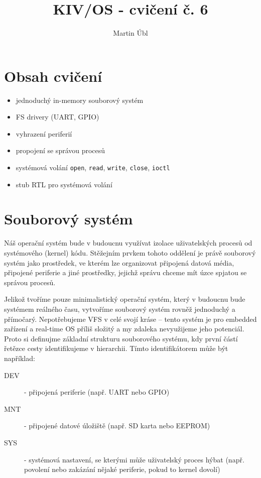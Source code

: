 \documentclass{article}
\author{Martin Úbl}
\title{KIV/OS - cvičení č. 6}
\begin{document}
\maketitle

\section{Obsah cvičení}

\begin{itemize}
	\item jednoduchý in-memory souborový systém
	\item FS drivery (UART, GPIO)
	\item vyhrazení periferií
	\item propojení se správou procesů
	\item systémová volání \texttt{open}, \texttt{read}, \texttt{write}, \texttt{close}, \texttt{ioctl}
	\item stub RTL pro systémová volání
\end{itemize}

\section{Souborový systém}

Náš operační systém bude v budoucnu využívat izolace uživatelských procesů od systémového (kernel) kódu. Stěžejním prvkem tohoto oddělení je právě souborový systém jako prostředek, ve kterém lze organizovat připojená datová média, připojené periferie a jiné prostředky, jejichž správu chceme mít úzce spjatou se správou procesů.

Jelikož tvoříme pouze minimalistický operační systém, který v budoucnu bude systémem reálného času, vytvoříme souborový systém rovněž jednoduchý a přímočarý. Nepotřebujeme VFS v celé svojí kráse -- tento systém je pro embedded zařízení a real-time OS příliš složitý a my zdaleka nevyužijeme jeho potenciál. Proto si definujme základní strukturu souborového systému, kdy první částí řetězce cesty identifikujeme  v hierarchii. Tímto identifikátorem může být například:
\begin{description}
	\item[DEV] - připojená periferie (např. UART nebo GPIO)
	\item[MNT] - připojené datové úložiště (např. SD karta nebo EEPROM)
	\item[SYS] - systémová nastavení, se kterými může uživatelský proces hýbat (např. povolení nebo zakázání nějaké periferie, pokud to kernel dovolí)
\end{description}
\end{document}
